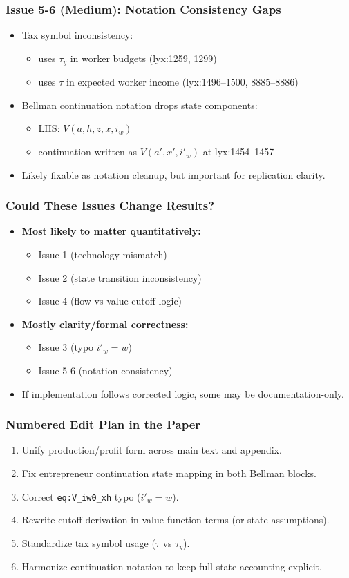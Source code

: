 ﻿\documentclass[english,aspectratio=169]{beamer}
\begin{document}
\begin{frame}
\frametitle{Issue 5-6 (Medium): Notation Consistency Gaps}
\begin{itemize}
\item Tax symbol inconsistency:
\begin{itemize}
\item uses $\tau_y$ in worker budgets (lyx:1259, 1299)
\item uses $\tau$ in expected worker income (lyx:1496--1500, 8885--8886)
\end{itemize}
\item Bellman continuation notation drops state components:
\begin{itemize}
\item LHS: $V(a,h,z,x,i_w)$
\item continuation written as $V(a',x',i'_w)$ at lyx:1454--1457
\end{itemize}
\item Likely fixable as notation cleanup, but important for replication clarity.
\end{itemize}
\end{frame}

\begin{frame}
\frametitle{Could These Issues Change Results?}
\begin{itemize}
\item \textbf{Most likely to matter quantitatively:}
\begin{itemize}
\item Issue 1 (technology mismatch)
\item Issue 2 (state transition inconsistency)
\item Issue 4 (flow vs value cutoff logic)
\end{itemize}
\item \textbf{Mostly clarity/formal correctness:}
\begin{itemize}
\item Issue 3 (typo $i'_w=w$)
\item Issue 5-6 (notation consistency)
\end{itemize}
\item If implementation follows corrected logic, some may be documentation-only.
\end{itemize}
\end{frame}

\begin{frame}
\frametitle{Numbered Edit Plan in the Paper}
\begin{enumerate}
\item Unify production/profit form across main text and appendix.
\item Fix entrepreneur continuation state mapping in both Bellman blocks.
\item Correct \texttt{eq:V\_iw0\_xh} typo ($i'_w=w$).
\item Rewrite cutoff derivation in value-function terms (or state assumptions).
\item Standardize tax symbol usage ($\tau$ vs $\tau_y$).
\item Harmonize continuation notation to keep full state accounting explicit.
\end{enumerate}
\end{frame}
\end{document}
